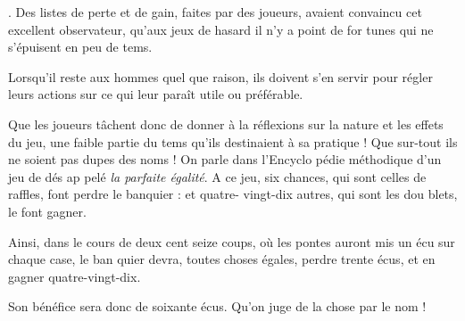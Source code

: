.
Des listes de perte et de gain, faites
par des joueurs, avaient convaincu
cet excellent observateur, qu'aux
jeux de hasard il n'y a point de for%
tunes qui ne s'épuisent en peu de
tems.

Lorsqu'il reste aux hommes quel%
que raison, ils doivent s'en servir
pour régler leurs actions sur ce qui
leur paraît utile ou préférable.

Que les joueurs tâchent donc de
donner à la réflexions sur la nature et
les effets du jeu, une faible partie du
tems qu'ils destinaient à sa pratique !
Que sur-tout ils ne soient pas dupes
des noms ! On parle dans l'Encyclo%
pédie méthodique d'un jeu de dés ap%
pelé \emph{la parfaite égalité}. A ce jeu, six
chances, qui sont celles de raffles,
font perdre le banquier : et quatre-%
vingt-dix autres, qui sont les dou%
blets, le font gagner.

Ainsi, dans le cours de deux cent
seize coups, où les pontes auront mis
un écu sur chaque case, le ban%
quier devra, toutes choses égales,
perdre trente écus, et en gagner
quatre-vingt-dix.

Son bénéfice sera donc de soixante
écus. Qu'on juge de la chose par le 
nom !
